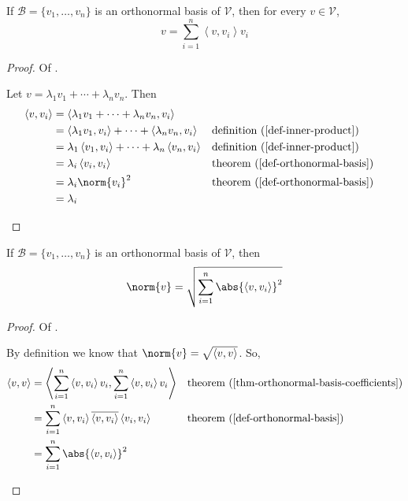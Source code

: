 \begin{thm}\label{thm-orthonormal-basis-coefficients}
	If $\mathcal{B}=\{v_1,\dots,v_n\}$ is an orthonormal basis of $\mathcal{V}$,
	then for every $v\in\mathcal{V}$,
	\begin{equation}
		v=\sum_{i=1}^n \left<v,v_i\right>v_i
	\end{equation}
\end{thm}

\begin{proof}
	Of .
	\begin{flushleft}
		Let $v=\lambda_1v_1+\cdots+\lambda_nv_n$. Then
		\begin{align*}
			\left<v,v_i\right> & = \left<\lambda_1v_1+\cdots+\lambda_nv_n,v_i\right>                                                                    \\
			                   & = \left<\lambda_1v_1,v_i\right>+\cdots+\left<\lambda_nv_n,v_i\right> &  & \text{\pref{definition}{def-inner-product}}  \\
			                   & = \lambda_1\left<v_1,v_i\right>+\cdots+\lambda_n\left<v_n,v_i\right> &  & \text{\pref{definition}{def-inner-product}}  \\
			                   & = \lambda_i\left<v_i,v_i\right>                                      &  & \text{\pref{theorem}{def-orthonormal-basis}} \\
			                   & = \lambda_i\norm{v_i}^2                                              &  & \text{\pref{theorem}{def-orthonormal-basis}} \\
			                   & = \lambda_i
		\end{align*}
	\end{flushleft}
\end{proof}

\begin{thm}\label{thm-orthonormal-basis-norm}
	If $\mathcal{B}=\{v_1,\dots,v_n\}$ is an orthonormal basis of $\mathcal{V}$,
	then
	\begin{equation}
		\norm{v}=\sqrt{\sum_{i=1}^n \abs{\left<v,v_i\right>}^2}
	\end{equation}
\end{thm}

\begin{proof}
	Of .
	\begin{flushleft}
		By definition we know that $\norm{v}=\sqrt{\left<v,v\right>}$. So,
		\begin{align*}
			\left<v,v\right> & = \left<\sum_{i=1}^n \left<v,v_i\right>v_i, \sum_{i=1}^n \left<v,v_i\right>v_i\right> &  & \text{\pref{theorem}{thm-orthonormal-basis-coefficients}} \\
			                 & = \sum_{i=1}^n \left<v,v_i\right>\overline{\left<v,v_i\right>} \left<v_i,v_i\right>   &  & \text{\pref{theorem}{def-orthonormal-basis}}              \\
			                 & = \sum_{i=1}^n \abs{\left<v,v_i\right>}^2
		\end{align*}
	\end{flushleft}
\end{proof}

